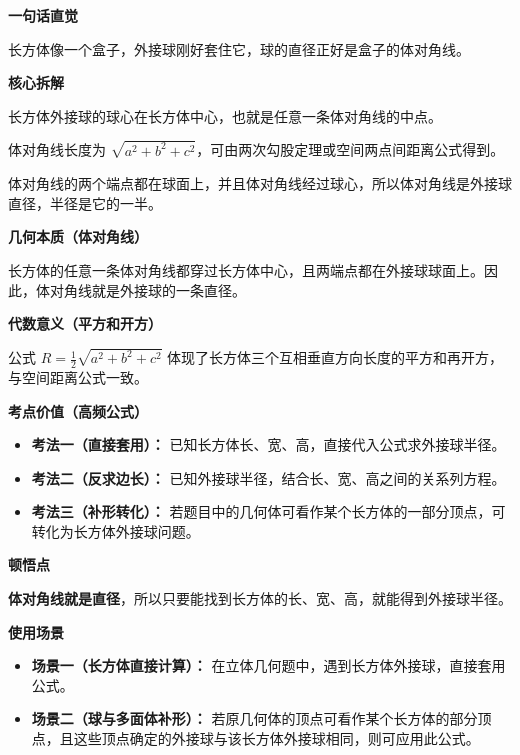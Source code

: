 \begin{explanationbox}
	\textbf{\textcolor{CExplanation}{一句话直觉}}

	长方体像一个盒子，外接球刚好套住它，球的直径正好是盒子的体对角线。

	\medskip
	\textbf{\textcolor{CExplanation}{核心拆解}}
	\begin{description}[style=nextline, leftmargin=2.8em, labelsep=0.5em, itemsep=0.45em]
		\item[\textbf{要点一（球心位置）：}] 长方体外接球的球心在长方体中心，也就是任意一条体对角线的中点。
		\item[\textbf{要点二（体对角线）：}] 体对角线长度为 $\sqrt{a^2+b^2+c^2}$，可由两次勾股定理或空间两点间距离公式得到。
		\item[\textbf{要点三（半径关系）：}] 体对角线的两个端点都在球面上，并且体对角线经过球心，所以体对角线是外接球直径，半径是它的一半。
	\end{description}

	\medskip
	\textbf{\textcolor{CExplanation}{几何本质（体对角线）}}

	长方体的任意一条体对角线都穿过长方体中心，且两端点都在外接球球面上。因此，体对角线就是外接球的一条直径。

	\medskip
	\textbf{\textcolor{CExplanation}{代数意义（平方和开方）}}

	公式 $R=\frac{1}{2}\sqrt{a^2+b^2+c^2}$ 体现了长方体三个互相垂直方向长度的平方和再开方，与空间距离公式一致。

	\medskip
	\textbf{\textcolor{CExplanation}{考点价值（高频公式）}}
	\begin{itemize}[leftmargin=*, itemsep=0.5em, topsep=0.4em]
		\item \textbf{考法一（直接套用）：} 已知长方体长、宽、高，直接代入公式求外接球半径。
		\item \textbf{考法二（反求边长）：} 已知外接球半径，结合长、宽、高之间的关系列方程。
		\item \textbf{考法三（补形转化）：} 若题目中的几何体可看作某个长方体的一部分顶点，可转化为长方体外接球问题。
	\end{itemize}

	\medskip
	\textbf{\textcolor{CExplanation}{顿悟点}}

	\textbf{体对角线就是直径}，所以只要能找到长方体的长、宽、高，就能得到外接球半径。

	\medskip
	\textbf{\textcolor{CExplanation}{使用场景}}
	\begin{itemize}[leftmargin=*, itemsep=0.5em, topsep=0.4em]
		\item \textbf{场景一（长方体直接计算）：} 在立体几何题中，遇到长方体外接球，直接套用公式。
		\item \textbf{场景二（球与多面体补形）：} 若原几何体的顶点可看作某个长方体的部分顶点，且这些顶点确定的外接球与该长方体外接球相同，则可应用此公式。
	\end{itemize}
\end{explanationbox}